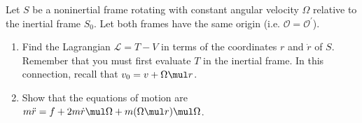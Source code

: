 \documentclass[../main.tex]{subfiles}
\begin{document}
\begin{problema}
	Let \(S\) be a noninertial frame rotating with constant angular velocity
	\(\Omega\) relative to the inertial frame \(S_{0}\). Let both frames
	have the same origin (i.e. \(\mathcal{O} = \mathcal{O}^{\prime}\)).

	\begin{enumerate}
		\item Find the Lagrangian \(\mathcal{L} = T - V\) in terms
		      of the coordinates \(r\) and \(\dot{r}\) of \(S\). Remember
		      that you must first evaluate \(T\) in the inertial frame. In
		      this connection, recall that \(v_{0} = v + \Omega \mul  r\).
		\item Show that the equations of motion are
		      \(m \ddot{r} = f + 2m \dot{r} \mul \Omega + m(\Omega \mul  r) \mul \Omega\).
	\end{enumerate}
\end{problema}
\end{document}
